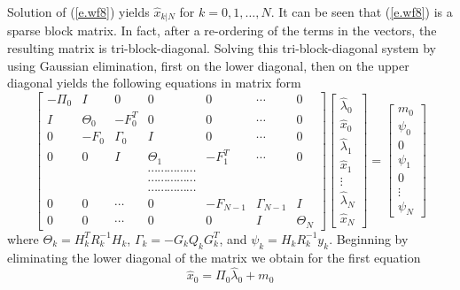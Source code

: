 	Solution of (\ref{e.wf8}) yields $\hat{x}_{k|N}$ for 
$k=0,1,\ldots,N$.  It can be seen that (\ref{e.wf8}) is a
sparse block matrix.  In fact, after a re-ordering of the terms
in the vectors, the resulting matrix is tri-block-diagonal.
Solving this tri-block-diagonal system by using Gaussian
elimination, first on the lower diagonal, then on the 
upper diagonal yields the following equations in matrix form
%
\begin{equation}
\left[\begin{array}{ccccccc}
         -\Pi_0&I&0&0&0&\cdots&0\\
         I&\Theta_0&-F_0^T&0&0&\cdots&0\\
         0&-F_0&\Gamma_0&I&0&\cdots&0\\
         0&0&I&\Theta_1&-F_1^T&\cdots&0\\
         &&&\cdots\cdots\cdots\cdots\cdots&&&\\
         &&&\cdots\cdots\cdots\cdots\cdots&&&\\
         &&&\cdots\cdots\cdots\cdots\cdots&&&\\
         0&0&\cdots&0&-F_{N-1}&\Gamma_{N-1}&I\\
         0&0&\cdots&0&0&I&\Theta_N\end{array}\right]
\left[\begin{array}{c}
         \hat{\lambda}_0\\
         \hat{x}_0\\
         \hat{\lambda}_1\\
         \hat{x}_1\\
         \vdots\\
         \hat{\lambda}_N\\
         \hat{x}_N\end{array}\right]
=\left[\begin{array}{c}
         m_0\\
         \psi_0\\
         0\\
         \psi_1\\
         0\\
         \vdots\\
         \psi_N\end{array}\right]
\label{e.wf8a}
\end{equation}
%
where $\Theta_k=H_k^TR_k^{-1}H_k$, $\Gamma_k=-G_kQ_kG_k^T$, and
$\psi_k=H_kR_k^{-1}y_k$.
Beginning by eliminating the lower diagonal of the matrix 
we obtain for the first
equation
%
\begin{equation}
\hat{x}_0=\Pi_0\hat{\lambda}_0+m_0
\label{e.wf8.b}
\end{equation}

